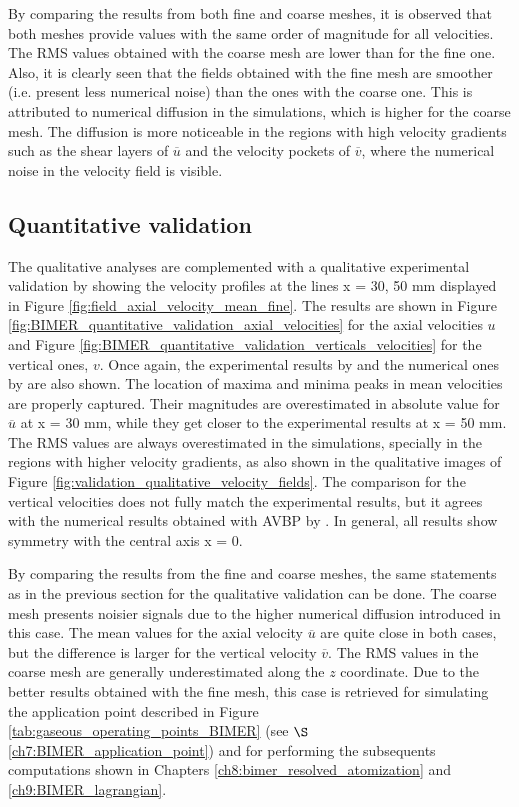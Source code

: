 By comparing the results from both fine and coarse meshes, it is observed that both meshes provide values with the same order of magnitude for all velocities. The RMS values obtained with the coarse mesh are lower than for the fine one. Also, it is clearly seen that the fields obtained with the fine mesh are smoother (i.e. present less numerical noise) than the ones with the coarse one. This is attributed to numerical diffusion in the simulations, which is higher for the coarse mesh. The diffusion is more noticeable in the regions with high velocity gradients such as the shear layers of $\overline{u}$ and the velocity pockets of $\overline{v}$, where the numerical noise in the velocity field is visible. 

\vspace{-0.1in}
\subsection{Quantitative validation}

The qualitative analyses are complemented with a qualitative experimental validation by showing the velocity profiles at the lines x = 30, 50 mm displayed in Figure \ref{fig:field_axial_velocity_mean_fine}.  The results are shown in Figure \ref{fig:BIMER_quantitative_validation_axial_velocities} for the axial velocities $u$ and Figure \ref{fig:BIMER_quantitative_validation_verticals_velocities} for the vertical ones, $v$. Once again, the experimental results by  and the numerical ones by  are also shown. The location of maxima and minima peaks in mean velocities are properly captured. Their magnitudes are overestimated in absolute value for $\overline{u}$ at x = 30 mm, while they get closer to the experimental results at x = 50 mm. The RMS values are always overestimated in the simulations, specially in the regions with higher velocity gradients, as also shown in the qualitative images of Figure \ref{fig:validation_qualitative_velocity_fields}. The comparison for the vertical velocities does not fully match the experimental results, but it agrees with the numerical results obtained with AVBP by  . In general, all results show symmetry with the central axis x = 0.

By comparing the results from the fine and coarse meshes, the same statements as in the previous section for the qualitative validation can be done. The coarse mesh presents noisier signals due to the higher numerical diffusion introduced in this case. The mean values for the axial velocity $\overline{u}$ are quite close in both cases, but the difference is larger for the vertical velocity $\overline{v}$. The RMS values in the coarse mesh are generally underestimated along the $z$ coordinate. Due to the better results obtained with the fine mesh, this case is retrieved for simulating the application point described in Figure \ref{tab:gaseous_operating_points_BIMER} (see $\S$\ref{ch7:BIMER_application_point}) and for performing the subsequents computations shown in Chapters \ref{ch8:bimer_resolved_atomization} and \ref{ch9:BIMER_lagrangian}.


